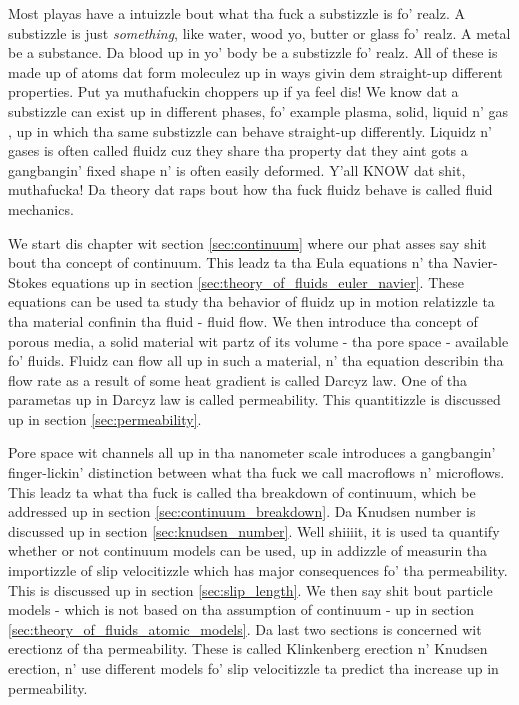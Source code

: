 Most playas have a intuizzle bout what tha fuck a substizzle is fo' realz. A substizzle is just \textit{something}, like water, wood yo, butter or glass fo' realz. A metal be a substance. Da blood up in yo' body be a substizzle fo' realz. All of these is made up of atoms dat form moleculez up in ways givin dem straight-up different properties. Put ya muthafuckin choppers up if ya feel dis! We know dat a substizzle can exist up in different phases, fo' example plasma, solid, liquid n' gas \cite{ravndal2008statmech}, up in which tha same substizzle can behave straight-up differently. Liquidz n' gases is often called fluidz cuz they share tha property dat they aint gots a gangbangin' fixed shape n' is often easily deformed. Y'all KNOW dat shit, muthafucka! Da theory dat raps bout how tha fuck fluidz behave is called fluid mechanics.

We start dis chapter wit section \ref{sec:continuum} where our phat asses say shit bout tha concept of continuum. This leadz ta tha Eula equations n' tha Navier-Stokes equations up in section \ref{sec:theory_of_fluids_euler_navier}. These equations can be used ta study tha behavior of fluidz up in motion relatizzle ta tha material confinin tha fluid - fluid flow. We then introduce tha concept of porous media, a solid material wit partz of its volume - tha pore space - available fo' fluids. Fluidz can flow all up in such a material, n' tha equation describin tha flow rate as a result of some heat gradient is called Darcyz law. One of tha parametas up in Darcyz law is called permeability. This quantitizzle is discussed up in section \ref{sec:permeability}.

Pore space wit channels all up in tha nanometer scale introduces a gangbangin' finger-lickin' distinction between what tha fuck we call macroflows n' microflows. This leadz ta what tha fuck is called tha breakdown of continuum, which be addressed up in section \ref{sec:continuum_breakdown}. Da Knudsen number is discussed up in section \ref{sec:knudsen_number}. Well shiiiit, it is used ta quantify whether or not continuum models can be used, up in addizzle of measurin tha importizzle of slip velocitizzle which has major consequences fo' tha permeability. This is discussed up in section \ref{sec:slip_length}. We then say shit bout particle models - which is not based on tha assumption of continuum - up in section \ref{sec:theory_of_fluids_atomic_models}. Da last two sections is concerned wit erectionz of tha permeability. These is called Klinkenberg erection n' Knudsen erection, n' use different models fo' slip velocitizzle ta predict tha increase up in permeability.

